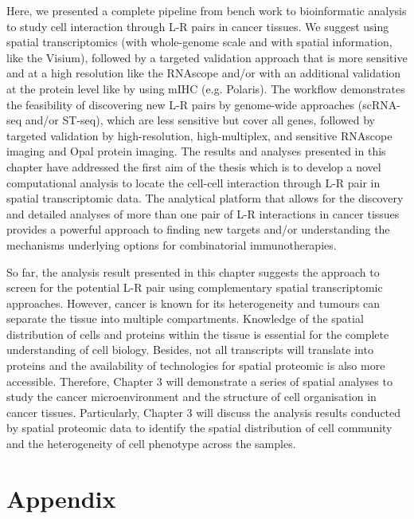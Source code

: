 Here, we presented a complete pipeline from bench work to bioinformatic analysis to study cell interaction through L-R pairs in cancer tissues. We suggest using spatial transcriptomics (with whole-genome scale and with spatial information, like the Visium), followed by a targeted validation approach that is more sensitive and at a high resolution like the RNAscope and/or with an additional validation at the protein level like by using mIHC (e.g. Polaris). The workflow demonstrates the feasibility of discovering new L-R pairs by genome-wide approaches (scRNA-seq and/or ST-seq), which are less sensitive but cover all genes, followed by targeted validation by high-resolution, high-multiplex, and sensitive RNAscope imaging and Opal protein imaging. The results and analyses presented in this chapter have addressed the first aim of the thesis which is to develop a novel computational analysis to locate the cell-cell interaction through L-R pair in spatial transcriptomic data.  The analytical platform that allows for the discovery and detailed analyses of more than one pair of L-R interactions in cancer tissues provides a powerful approach to finding new targets and/or understanding the mechanisms underlying options for combinatorial immunotherapies. 

So far, the analysis result presented in this chapter suggests the approach to screen for the potential L-R pair using complementary spatial transcriptomic approaches.  However, cancer is known for its heterogeneity and tumours can separate the tissue into multiple compartments. Knowledge of the spatial distribution of cells and proteins within the tissue is essential for the complete understanding of cell biology. Besides, not all transcripts will translate into proteins and the availability of technologies for spatial proteomic is also more accessible. Therefore, Chapter 3 will demonstrate a series of spatial analyses to study the cancer microenvironment and the structure of cell organisation in cancer tissues.  Particularly, Chapter 3 will discuss the analysis results conducted by spatial proteomic data to identify the spatial distribution of cell community and the heterogeneity of cell phenotype across the samples. 


\section{Appendix}




\typeout{}

% 

% 
